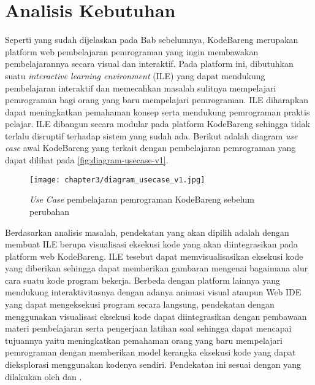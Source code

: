 
\section{Analisis Kebutuhan} \label{sec:analisis-kebutuhan}
Seperti yang sudah dijelaskan pada Bab sebelumnya, KodeBareng merupakan platform web pembelajaran pemrograman yang ingin membawakan pembelajarannya secara visual dan interaktif. Pada platform ini, dibutuhkan suatu \textit{interactive learning environment} (ILE) yang dapat mendukung pembelajaran interaktif dan memecahkan masalah sulitnya mempelajari pemrograman bagi orang yang baru mempelajari pemrograman. ILE diharapkan dapat meningkatkan pemahaman konsep serta mendukung pemrograman praktis pelajar. ILE dibangun secara modular pada platform KodeBareng sehingga tidak terlalu disruptif terhadap sistem yang sudah ada. Berikut adalah diagram \textit{use case} awal KodeBareng yang terkait dengan pembelajaran pemrograman yang dapat dilihat pada \autoref{fig:diagram-usecase-v1}.

\begin{figure}[H]
  \centering
  \texttt{[image: chapter3/diagram\_usecase\_v1.jpg]}
  \caption{\textit{Use Case} pembelajaran pemrograman KodeBareng sebelum perubahan} \label{fig:diagram-usecase-v1}
\end{figure}

Berdasarkan analisis masalah, pendekatan yang akan dipilih adalah dengan membuat ILE berupa visualisasi eksekusi kode yang akan diintegrasikan pada platform web KodeBareng. ILE tesebut dapat memvisualisasikan eksekusi kode yang diberikan sehingga dapat memberikan gambaran mengenai bagaimana alur cara suatu kode program bekerja. Berbeda dengan platform lainnya yang mendukung interaktivitasnya dengan adanya animasi visual ataupun Web IDE yang dapat mengeksekusi program secara langsung, pendekatan dengan menggunakan visualisasi eksekusi kode dapat diintegrasikan dengan pembawaan materi pembelajaran serta pengerjaan latihan soal sehingga dapat mencapai tujuannya yaitu meningkatkan pemahaman orang yang baru mempelajari pemrograman dengan memberikan model kerangka eksekusi kode yang dapat dieksplorasi menggunakan kodenya sendiri. Pendekatan ini sesuai dengan yang dilakukan oleh \textcite{moons2013pilot} dan \textcite{mayer1981psychology}.

